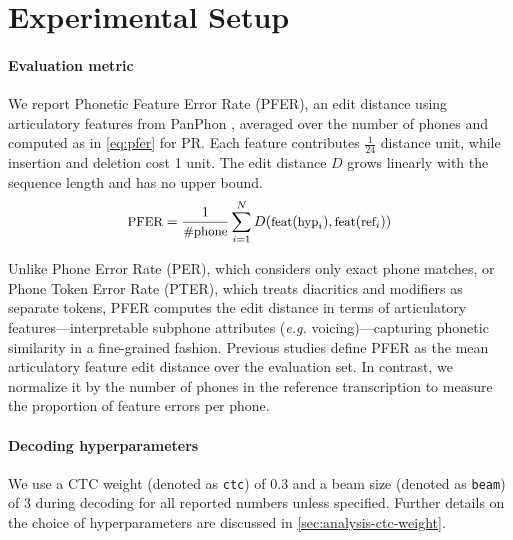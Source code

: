 \section{Experimental Setup}

\paragraph{Evaluation metric}
We report Phonetic Feature Error Rate (PFER), an edit distance using articulatory features from PanPhon \citep{panphon}, averaged over the number of phones and computed as in \autoref{eq:pfer} for PR. 
Each feature contributes $\frac{1}{24}$ distance unit, while insertion and deletion cost 1 unit. 
The edit distance $D$ grows linearly with the sequence length and has no upper bound.
\begin{equation}
\label{eq:pfer}\small
    \text{PFER} = \frac{1}{\text{\#phone}}\sum_{i=1}^N D(\text{feat}(\text{hyp}_i),\text{feat}(\text{ref}_i))
\end{equation}

Unlike Phone Error Rate (PER), which considers only exact phone matches, or Phone Token Error Rate (PTER), which treats diacritics and modifiers as separate tokens, PFER computes the edit distance in terms of articulatory features---interpretable subphone attributes (\textit{e.g.} voicing)---capturing phonetic similarity in a fine-grained fashion. 
Previous studies \cite{taguchi23_interspeech, zhu-etal-2025-zipa} define PFER as the mean articulatory feature edit distance over the evaluation set. In contrast, we normalize it by the number of phones in the reference transcription to measure the proportion of feature errors per phone.


\paragraph{Decoding hyperparameters}
We use a CTC weight (denoted as \texttt{ctc}) of 0.3 and a beam size (denoted as \texttt{beam}) of 3 during decoding for all reported numbers unless specified. Further details on the choice of hyperparameters are discussed in \autoref{sec:analysis-ctc-weight}.

